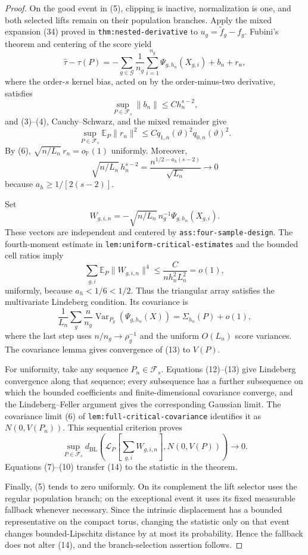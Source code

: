 \documentclass{article}
\begin{document}
\begin{proof}
On the good event in (5), clipping is inactive, normalization is one, and both selected lifts remain on their population branches.  Apply the mixed expansion (34) proved in \texttt{thm:nested-derivative} to \(u_g=\widetilde f_g-f_g\).  Fubini's theorem and centering of the score yield
\[
 \widehat\tau-\tau(P)
 =-\sum_{g\in\mathcal G}\frac1{n_g}\sum_{i=1}^{n_g}
   \Psi_{g,h_n}(X_{g,i})+b_n+r_n,                                     \tag{7}
\]
where the order-\(s\) kernel bias, acted on by the order-minus-two derivative, satisfies
\[
 \sup_{P\in\mathcal F_s}\|b_n\|\leq Ch_n^{s-2},                     \tag{8}
\]
and (3)--(4), Cauchy--Schwarz, and the mixed remainder give
\[
 \sup_{P\in\mathcal F_s}
 \mathbb E_P\|r_n\|^2
 \leq Cq_{1,n}(\vartheta)^2q_{0,n}(\vartheta)^2.                     \tag{9}
\]
By (6), \(\sqrt{n/L_n}\,r_n=o_{\mathbb P}(1)\) uniformly.  Moreover,
\[
 \sqrt{n/L_n}\,h_n^{s-2}
 =\frac{n^{1/2-a_h(s-2)}}{\sqrt{L_n}}\longrightarrow0                 \tag{10}
\]
because \(a_h\geq1/[2(s-2)]\).

Set
\[
 W_{g,i,n}=-\sqrt{n/L_n}\,n_g^{-1}\Psi_{g,h_n}(X_{g,i}).             \tag{11}
\]
These vectors are independent and centered by \texttt{ass:four-sample-design}.  The fourth-moment estimate in \texttt{lem:uniform-critical-estimates} and the bounded cell ratios imply
\[
 \sum_{g,i}\mathbb E_P\|W_{g,i,n}\|^4
 \leq\frac{C}{nh_n^2L_n^2}=o(1),                                     \tag{12}
\]
uniformly, because \(a_h<1/6<1/2\).  Thus the triangular array satisfies the multivariate Lindeberg condition.  Its covariance is
\[
 \frac1{L_n}\sum_g\frac n{n_g}
 \operatorname{Var}_{P_g}(\Psi_{g,h_n}(X))
 =\Sigma_{h_n}(P)+o(1),                                                \tag{13}
\]
where the last step uses \(n/n_g\to\rho_g^{-1}\) and the uniform \(O(L_n)\) score variances.  The covariance lemma gives convergence of (13) to \(V(P)\).

For uniformity, take any sequence \(P_n\in\mathcal F_s\).  Equations (12)--(13) give Lindeberg convergence along that sequence; every subsequence has a further subsequence on which the bounded coefficients and finite-dimensional covariance converge, and the Lindeberg--Feller argument gives the corresponding Gaussian limit.  The covariance limit (6) of \texttt{lem:full-critical-covariance} identifies it as \(N(0,V(P_n))\).  This sequential criterion proves
\[
 \sup_{P\in\mathcal F_s}d_{\mathrm{BL}}
 \left(\mathcal L_P\!\left[\sum_{g,i}W_{g,i,n}\right],N(0,V(P))\right)
 \longrightarrow0.                                                    \tag{14}
\]
Equations (7)--(10) transfer (14) to the statistic in the theorem.

Finally, (5) tends to zero uniformly.  On its complement the lift selector uses the regular population branch; on the exceptional event it uses its fixed measurable fallback whenever necessary.  Since the intrinsic displacement has a bounded representative on the compact torus, changing the statistic only on that event changes bounded-Lipschitz distance by at most its probability.  Hence the fallback does not alter (14), and the branch-selection assertion follows.
\end{proof}
\end{document}
